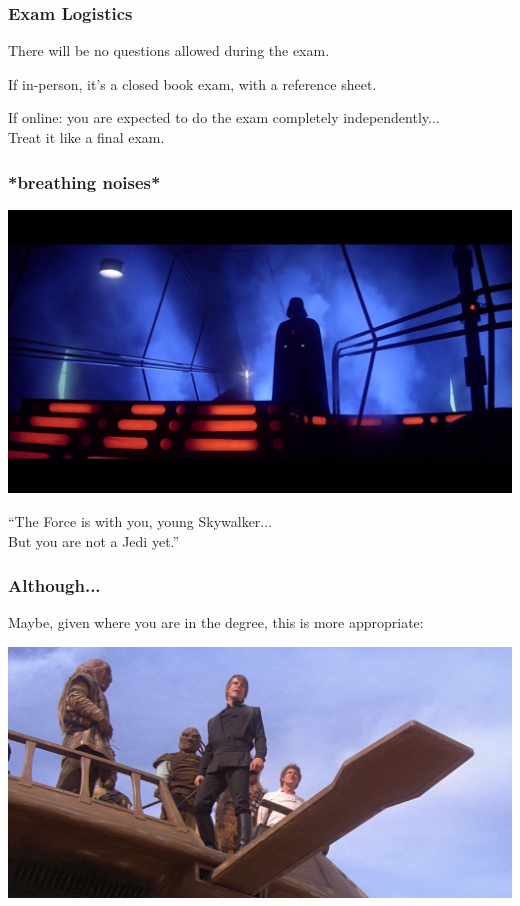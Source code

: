 \begin{frame}
\frametitle{Exam Logistics}
There will be no questions allowed during the exam.

If in-person, it's a closed book exam, with a reference sheet.

If online: you are expected to do the exam completely independently...\\
\quad Treat it like a final exam.


\end{frame}



\begin{frame}
\frametitle{*breathing noises*}

\begin{center}
	\includegraphics[width=\textwidth]{images/vader.jpg}
\end{center}

``The Force is with you, young Skywalker...\\
\quad But you are not a Jedi yet.''


\end{frame}

\begin{frame}
\frametitle{Although...}

Maybe, given where you are in the degree, this is more appropriate:

\begin{center}
	\includegraphics[width=\textwidth]{images/skiff.jpeg}
\end{center}



\end{frame}




